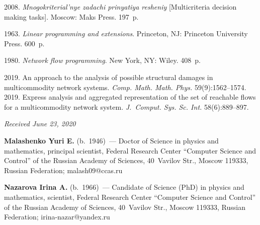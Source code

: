  \begin{multicols}{2}

\renewcommand{\bibname}{\protect\rmfamily References}

{\small\frenchspacing
 {%
 \begin{thebibliography}{9}
2008. \textit{Mnogokriterial'nye zadachi prinyatiya resheniy} 
[Multicriteria decision making tasks]. Moscow: Maks Press. 197~p.

 1963. 
\textit{Linear programming and extensions}. 
Princeton, NJ: Princeton University Press. 600~p.

 1980. \textit{Network flow programming}. New York, NY: Wiley. 408~p.
 
 2019. An approach to the analysis of possible structural damages 
 in multicommodity network systems. 
 \textit{Comp. Math. Math. Phys.} 59(9):1562--1574. 
 2019. Express analysis and aggregated representation of the set of 
 reachable flows for a multicommodity network system. 
 \textit{J.~Comput. Sys. Sc. Int.} 58(6):889--897.  
 \end{thebibliography}

 }
 }

\end{multicols}

\vspace*{-6pt}

\hfill{\small\textit{Received June 23, 2020}}




\Contr

\noindent
\textbf{Malashenko Yuri E.} (b.\ 1946)~--- 
Doctor of Science in physics and mathematics, principal scientist, 
Federal Research Center ``Computer Science and Control'' 
of the Russian Academy of Sciences, 40~Vavilov Str., Moscow 119333, Russian Federation; 
\mbox{malash09@ccas.ru} 

\vspace*{3pt}

\noindent
\textbf{Nazarova Irina A.} (b.\ 1966)~--- 
Candidate of Science (PhD) in physics and mathematics, scientist, 
Federal Research Center ``Computer Science and Control''
 of the Russian Academy of Sciences, 40~Vavilov Str., Moscow 119333, Russian Federation; 
 \mbox{irina-nazar@yandex.ru}


\label{end\stat}

\renewcommand{\bibname}{\protect\rm Литература} 